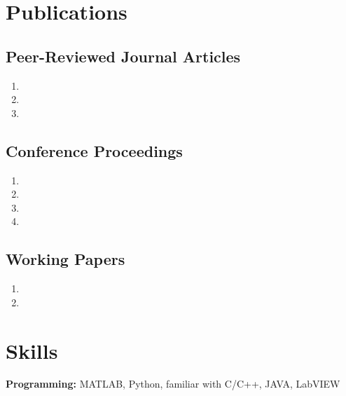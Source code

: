 \documentclass[10pt,letterpaper]{article}
\begin{document}
\vspace{-0.25in}

\section*{Publications}
\vspace{-0.05in}


\subsection*{Peer-Reviewed Journal Articles}

\begin{enumerate}
\item {}
\item {}
\item {}
\end{enumerate}

\subsection*{Conference Proceedings}

\begin{enumerate}[resume]
\item {}
\item {}
\item {}
\item {}
\end{enumerate}

\subsection*{Working Papers}
\begin{enumerate}[resume]
\item {}
\item {}
\end{enumerate}

\vspace{-0.25in}

\section*{Skills}
\vspace{-0.05in}
\hspace{1.5em}\textbf{Programming:} MATLAB, Python, familiar with C/C++, JAVA, LabVIEW
\end{document}
